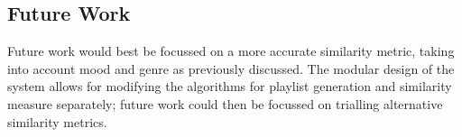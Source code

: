\subsection{Future Work}
Future work would best be focussed on a more accurate similarity metric, taking into account mood and genre as previously discussed. The modular design of the system allows for modifying the algorithms for playlist generation and similarity measure separately; future work could then be focussed on trialling alternative similarity metrics.
